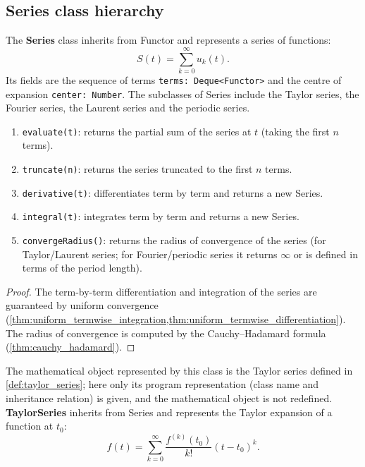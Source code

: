 \newpage

\subsection{Series class hierarchy}

\begin{definition}\label{def:series_class}
The \textbf{Series} class inherits from Functor and represents a series of functions:
\[
S(t) = \sum_{k=0}^{\infty} u_k(t).
\]
Its fields are the sequence of terms \texttt{terms: Deque<Functor>} and the centre of expansion \texttt{center: Number}. The subclasses of Series include the Taylor series, the Fourier series, the Laurent series and the periodic series.
\end{definition}

\begin{property}\label{prop:series_class_methods}
\begin{enumerate}[label=(\roman*)]
    \item \texttt{evaluate(t)}: returns the partial sum of the series at $t$ (taking the first $n$ terms).
    \item \texttt{truncate(n)}: returns the series truncated to the first $n$ terms.
    \item \texttt{derivative(t)}: differentiates term by term and returns a new Series.
    \item \texttt{integral(t)}: integrates term by term and returns a new Series.
    \item \texttt{convergeRadius()}: returns the radius of convergence of the series (for Taylor/Laurent series; for Fourier/periodic series it returns $\infty$ or is defined in terms of the period length).
\end{enumerate}
\end{property}

\begin{proof}
The term-by-term differentiation and integration of the series are guaranteed by uniform convergence (\cref{thm:uniform_termwise_integration,thm:uniform_termwise_differentiation}). The radius of convergence is computed by the Cauchy--Hadamard formula (\cref{thm:cauchy_hadamard}).
\end{proof}

\begin{definition}\label{def:taylor_series_class}
The mathematical object represented by this class is the Taylor series defined in \cref{def:taylor_series}; here only its program representation (class name and inheritance relation) is given, and the mathematical object is not redefined. \textbf{TaylorSeries} inherits from Series and represents the Taylor expansion of a function at $t_0$:
\[
f(t) = \sum_{k=0}^{\infty} \frac{f^{(k)}(t_0)}{k!}(t - t_0)^k.
\]
\end{definition}


